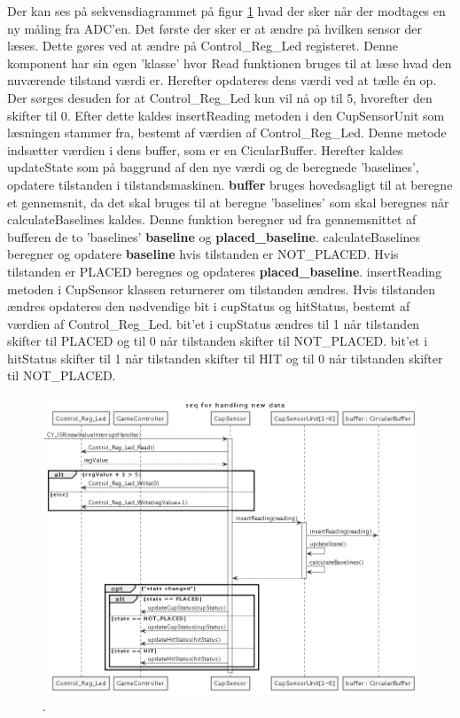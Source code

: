 \documentclass[Softwaredesign/Softwaredesign_main.tex]{subfiles}
\begin{document}
Der kan ses på sekvensdiagrammet på figur \ref{fig:CupSensor-IF-getting-reading} hvad der sker når der modtages en ny måling fra ADC'en. Det første der sker er at ændre på hvilken sensor der læses. Dette gøres ved at ændre på Control\_Reg\_Led registeret. Denne komponent har sin egen 'klasse' hvor Read funktionen bruges til at læse hvad den nuværende tilstand værdi er. Herefter opdateres dens værdi ved at tælle én op. Der sørges desuden for at Control\_Reg\_Led kun vil nå op til 5, hvorefter den skifter til 0. 
Efter dette kaldes insertReading metoden i den CupSensorUnit som læsningen stammer fra, bestemt af værdien af Control\_Reg\_Led. Denne metode indsætter værdien i dens buffer, som er en CicularBuffer. Herefter kaldes updateState som på baggrund af den nye værdi og de beregnede 'baselines', opdatere tilstanden i tilstandsmaskinen. \textbf{buffer} bruges hovedsagligt til at beregne et gennemsnit, da det skal bruges til at beregne 'baselines' som skal beregnes når calculateBaselines kaldes. Denne funktion beregner ud fra gennemsnittet af bufferen de to 'baselines' \textbf{baseline} og \textbf{placed\_baseline}. calculateBaselines beregner og opdatere \textbf{baseline} hvis tilstanden er NOT\_PLACED. Hvis tilstanden er PLACED beregnes og opdateres \textbf{placed\_baseline}.
insertReading metoden i CupSensor klassen returnerer om tilstanden ændres. Hvis tilstanden ændres opdateres den nødvendige bit i cupStatus og hitStatus, bestemt af værdien af Control\_Reg\_Led. bit'et i cupStatus ændres til 1 når tilstanden skifter til PLACED og til 0 når tilstanden skifter til NOT\_PLACED. bit'et i hitStatus skifter til 1 når tilstanden skifter til HIT og til 0 når tilstanden skifter til NOT\_PLACED. 
\begin{figure}[H]
    \centering
    \includegraphics[width=1\textwidth]{Softwaredesign/CupSensor_IF/graphics/getting_reading.png}
    \caption{.}
    \label{fig:CupSensor-IF-getting-reading}
\end{figure}
\end{document}
